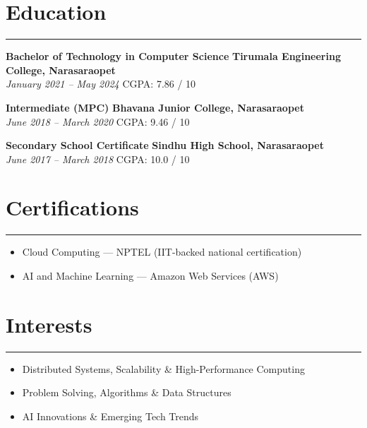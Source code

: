 \documentclass[12pt]{article}
\begin{document}
\section*{Education}
\vspace{1pt}\hrule\vspace{4pt}
\textbf{Bachelor of Technology in Computer Science} \hfill \textbf{Tirumala Engineering College, Narasaraopet} \\
\textit{January 2021 -- May 2024} \quad CGPA: 7.86 / 10

\textbf{Intermediate (MPC)} \hfill \textbf{Bhavana Junior College, Narasaraopet} \\
\textit{June 2018 -- March 2020} \quad CGPA: 9.46 / 10

\textbf{Secondary School Certificate} \hfill \textbf{Sindhu High School, Narasaraopet} \\
\textit{June 2017 -- March 2018} \quad CGPA: 10.0 / 10

\vspace{6pt}

\section*{Certifications}
\vspace{1pt}\hrule\vspace{4pt}
\begin{itemize}
  \item Cloud Computing --- NPTEL (IIT-backed national certification)
  \item AI and Machine Learning --- Amazon Web Services (AWS)
\end{itemize}

\section*{Interests}
\vspace{1pt}\hrule\vspace{4pt}
\begin{itemize}
  \item Distributed Systems, Scalability \& High-Performance Computing
  \item Problem Solving, Algorithms \& Data Structures
  \item AI Innovations \& Emerging Tech Trends
\end{itemize}
\end{document}
